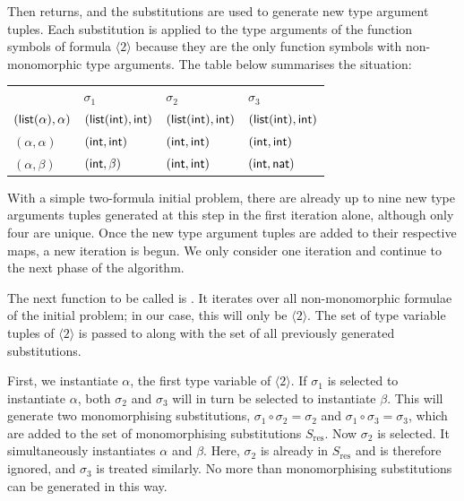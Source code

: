 \documentclass[runningheads]{llncs}
\begin{document}
Then \SubstGen returns, and the substitutions are used to generate new type argument tuples. Each substitution is applied to the type arguments of the function symbols of formula \(\langle2\rangle\) because they are the only function symbols with non-monomorphic type arguments.
The table below summarises the situation:
%
\begin{center}
\begin{tabular}{@{}l*{3}{>{\centering\arraybackslash}p{6em}}@{}}
   \toprule
   & \(\sigma_1\) &\(\sigma_2\)&\(\sigma_3\)\\
   \cmidrule(lr){2-2} \cmidrule(lr){3-3} \cmidrule(l){4-4} 
   \((\textsf{list}(\alpha), \alpha)\)&\((\textsf{list}(\textsf{int}), \textsf{int})\)& \((\textsf{list}(\textsf{int}), \textsf{int})\) & \((\textsf{list}(\textsf{int}), \textsf{int})\) \\
   \((\alpha, \alpha)\) &\((\textsf{int}, \textsf{int})\)&\((\textsf{int}, \textsf{int})\) &\((\textsf{int}, \textsf{int})\)\\
   \((\alpha, \beta)\)  &\((\textsf{int}, \beta)\)&\((\textsf{int}, \textsf{int})\) &\((\textsf{int}, \textsf{nat})\)\\
    \bottomrule
\end{tabular}
\end{center}
%
With a simple two-formula initial problem, there are already up to nine new type arguments tuples generated at this step in the first iteration alone, although only four are unique. Once the new type argument tuples are added to their respective maps, a new iteration is begun. We only consider one iteration and continue to the next phase of the algorithm.

The next function to be called is \GenFormulae. It iterates over all non-monomorphic formulae of the initial problem; in our case, this will only be \(\langle2\rangle\). The set of type variable tuples of \(\langle2\rangle\) is passed to \MonoSubst along with the set of all previously generated substitutions.

First, we instantiate \(\alpha\), the first type variable of \(\langle2\rangle\). If \(\sigma_1\) is selected to instantiate \(\alpha\), both \(\sigma_2\) and \(\sigma_3\) will in turn be selected to instantiate \(\beta\). This will generate two monomorphising substitutions, \(\sigma_1 \circ \sigma_2 = \sigma_2\) and \(\sigma_1 \circ \sigma_3 = \sigma_3\), which are added to the set of monomorphising substitutions \(S_{\text{res}}\). Now \(\sigma_2\) is selected. It simultaneously instantiates \(\alpha\) and \(\beta\). Here, \(\sigma_2\) is already in \(S_{\text{res}}\) and is therefore ignored, and \(\sigma_3\) is treated similarly. No more than \SubstLimit monomorphising substitutions can be generated in this way.
\end{document}
